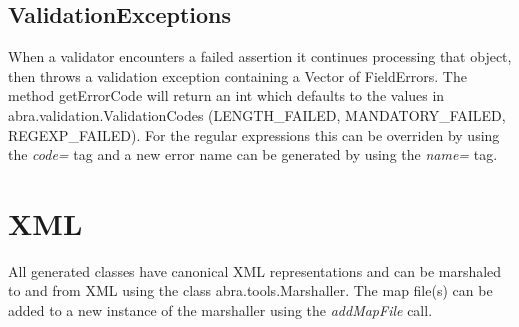 \documentclass[10pt,openany]{book}
\begin{document}
\subsection{ValidationExceptions}
When a validator encounters a failed assertion it continues processing
that object, then throws a validation exception containing a Vector of
FieldErrors.  The method getErrorCode will return an int which
defaults to the values in abra.validation.ValidationCodes
(LENGTH\_FAILED, MANDATORY\_FAILED, REGEXP\_FAILED).   For the regular
expressions this can be overriden by using the \textit{code=} tag and
a new error name can be generated by using the \textit{name=} tag.

\section{XML}

All generated classes have canonical XML representations and can be
marshaled to and from XML using the class abra.tools.Marshaller.  The
map file(s) can be added to a new instance of the marshaller using the
\textit{addMapFile} call.

\appendix

\end{document}
